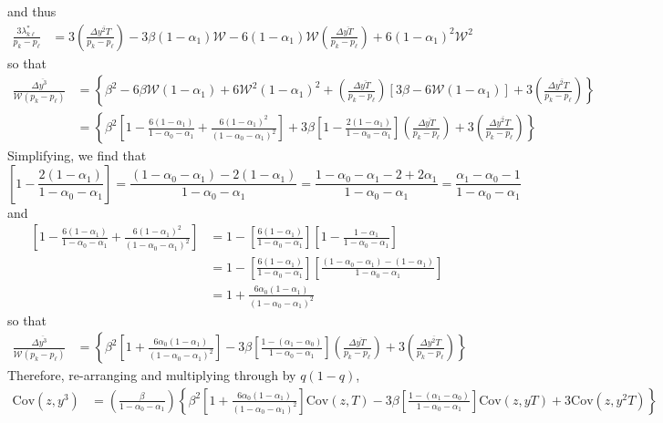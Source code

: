 \documentclass[12pt]{article}
\begin{document}
and thus
\begin{align*}
  \frac{3 \lambda^*_{k\ell}}{p_k - p_\ell} &= 
  3\left(\frac{\Delta\overline{y^2T}}{p_k - p_\ell}\right) -  3\beta(1-\alpha_1)\mathcal{W} - 6(1-\alpha_1)\mathcal{W} \left(\frac{\Delta \overline{yT}}{p_k - p_\ell}\right) + 6(1-\alpha_1)^2\mathcal{W}^2
\end{align*}
so that 
\small
\begin{align*}
  \frac{\Delta\overline{y^3}}{\mathcal{W}(p_k - p_\ell)} &=
  \left\{ \beta^2 - 6\beta\mathcal{W}(1 - \alpha_1) + 6\mathcal{W}^2(1 - \alpha_1)^2 + \left( \frac{\Delta\overline{yT}}{p_k - p_\ell} \right)\left[ 3\beta - 6\mathcal{W}(1 - \alpha_1) \right] + 3\left( \frac{\Delta\overline{y^2T}}{p_k - p_\ell} \right)  \right\}\\
  &= \left\{ \beta^2\left[1 - \frac{6(1 - \alpha_1)}{1 - \alpha_0 - \alpha_1}  + \frac{6(1 - \alpha_1)^2}{(1 - \alpha_0 - \alpha_1)^2}\right]   + 3\beta\left[ 1 - \frac{2(1 - \alpha_1)}{1 - \alpha_0 - \alpha_1} \right] \left( \frac{\Delta\overline{yT}}{p_k - p_\ell} \right)+ 3\left( \frac{\Delta\overline{y^2T}}{p_k - p_\ell} \right) \right\}
\end{align*}
\normalsize
Simplifying, we find that
\[
  \left[1 - \frac{2(1 - \alpha_1)}{1 - \alpha_0 - \alpha_1}\right] 
  = \frac{(1 - \alpha_0 - \alpha_1) - 2(1 - \alpha_1)}{1 - \alpha_0 - \alpha_1}
  =\frac{1 - \alpha_0 - \alpha_1 - 2 + 2\alpha_1}{1 - \alpha_0 - \alpha_1}
  = \frac{\alpha_1 - \alpha_0 - 1}{1 - \alpha_0 - \alpha_1}
\]
and
\begin{align*}
\left[1 - \frac{6(1 - \alpha_1)}{1 - \alpha_0 - \alpha_1}  + \frac{6(1 - \alpha_1)^2}{(1 - \alpha_0 - \alpha_1)^2}\right] 
&= 1 - \left[ \frac{6(1 - \alpha_1)}{1 - \alpha_0 - \alpha_1} \right]\left[ 1 - \frac{1 - \alpha_1}{1 - \alpha_0 - \alpha_1} \right]\\
&= 1 - \left[ \frac{6(1 - \alpha_1)}{1 - \alpha_0 - \alpha_1} \right]\left[  \frac{(1 - \alpha_0 - \alpha_1) - (1 - \alpha_1)}{1 - \alpha_0 - \alpha_1} \right]\\
&= 1 + \frac{6\alpha_0(1 - \alpha_1)}{(1 - \alpha_0 - \alpha_1)^2}
\end{align*}
so that
\begin{align*}
  \frac{\Delta\overline{y^3}}{\mathcal{W}(p_k - p_\ell)} 
  &= \left\{ \beta^2\left[1 + \frac{6\alpha_0(1 - \alpha_1)}{(1 - \alpha_0 - \alpha_1)^2} \right] - 3\beta\left[ \frac{1 - (\alpha_1 - \alpha_0)}{1 - \alpha_0 - \alpha_1} \right] \left( \frac{\Delta\overline{yT}}{p_k - p_\ell} \right)+ 3\left( \frac{\Delta\overline{y^2T}}{p_k - p_\ell} \right) \right\}
\end{align*}
Therefore, re-arranging and multiplying through by $q(1 - q)$,
\footnotesize
\begin{align*}
  \mbox{Cov}(z,y^3) 
  &= \left( \frac{\beta}{1 - \alpha_0 - \alpha_1} \right)\left\{ \beta^2\left[1 + \frac{6\alpha_0(1 - \alpha_1)}{(1 - \alpha_0 - \alpha_1)^2} \right] \mbox{Cov}(z,T) - 3\beta\left[ \frac{1 - (\alpha_1 - \alpha_0)}{1 - \alpha_0 - \alpha_1} \right] \mbox{Cov}(z,yT) + 3\mbox{Cov}(z,y^2T) \right\}
\end{align*}
\normalsize
\end{document}

